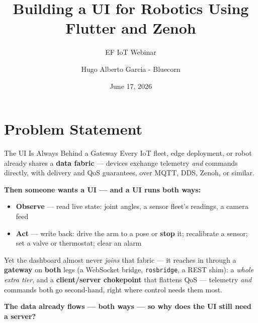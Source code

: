 \documentclass[9pt]{beamer}
\title{Building a UI for Robotics Using Flutter and Zenoh}
\subtitle{EF IoT Webinar}
\author{Hugo Alberto Garcia - Bluecorn}
\date{June 17, 2026}
\begin{document}
\bluecorntitleframe

\section{Problem Statement}

\begin{frame}{The UI Is Always Behind a Gateway}
  Every IoT fleet, edge deployment, or robot already shares a \textbf{data fabric} --- devices exchange telemetry \emph{and} commands directly, with delivery and QoS guarantees, over MQTT, DDS, Zenoh, or similar.

  \vspace{0.3em}
  \textbf{Then someone wants a UI --- and a UI runs both ways:}
  \begin{itemize}
    \item \textbf{Observe} --- read live state: joint angles, a sensor fleet's readings, a camera feed
    \item \textbf{Act} --- write back: drive the arm to a pose or \textbf{stop} it; recalibrate a sensor; set a valve or thermostat; clear an alarm
  \end{itemize}

  \vspace{0.25em}
  Yet the dashboard almost never \emph{joins} that fabric --- it reaches in through a \textbf{gateway} on \textbf{both} legs (a WebSocket bridge, \texttt{rosbridge}, a REST shim): a \emph{whole extra tier}, and a \textbf{client/server chokepoint} that flattens QoS --- telemetry \emph{and} commands both go second-hand, right where control needs them most.

  \vspace{0.35em}
  \begin{center}
    {\large\textbf{The data already flows --- both ways --- so why does the UI still need a server?}}
  \end{center}
\end{frame}
\end{document}
